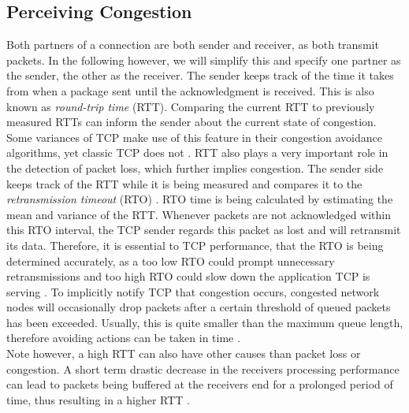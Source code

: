 \documentclass[a4paper,conference]{IEEEtran}
\begin{document}
\subsection{Perceiving Congestion}
\label{P_C_marker}
Both partners of a connection are both sender and receiver, as both transmit packets. In the following however, we will simplify this and specify one partner as the sender, the other as the receiver. The sender keeps track of the time it takes from when a package sent until the acknowledgment is received. This is also known as \textit{round-trip time} (RTT). Comparing the current RTT to previously measured RTTs can inform the sender about the current state of congestion. Some variances of TCP make use of this feature in their congestion avoidance algorithms, yet classic TCP does not \cite{huston2000tcp,jacobson1995congestion}. RTT also plays a very important role in the detection of packet loss, which further implies congestion. The sender side keeps track of the RTT while it is being measured and compares it to the \textit{retransmission timeout} (RTO) \cite{jacobson1992tcp}. RTO time is being calculated by estimating the mean and variance of the RTT. Whenever packets are not acknowledged within this RTO interval, the TCP sender regards this packet as lost and will retransmit its data. Therefore, it is essential to TCP performance, that the RTO is being determined accurately, as a too low RTO could prompt unnecessary retransmissions and too high RTO could slow down the application TCP is serving \cite{huston2000tcp,jacobson1995congestion}. To implicitly notify TCP that congestion occurs, congested network nodes will occasionally drop packets after a certain threshold of queued packets has been exceeded. Usually, this is quite smaller than the maximum queue length, therefore avoiding actions can be taken in time \cite{ramakrishnan1999proposal}.\\
Note however, a high RTT can also have other causes than packet loss or congestion. A short term drastic decrease in the receivers processing performance can lead to packets being buffered at the receivers end for a prolonged period of time, thus resulting in a higher RTT \cite{huston2000tcp}.
\end{document}

